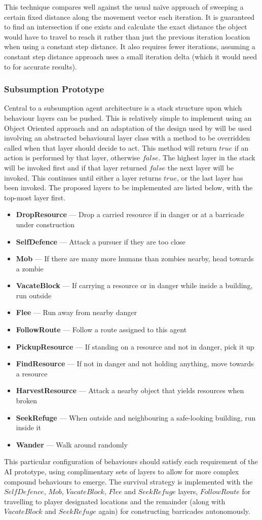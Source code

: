 \documentclass[12pt,a4paper]{article}
\newcommand{\layer}[2]{\item \textbf{#1} --- #2\vspace{-1mm}}
\begin{document}
This technique compares well against the usual na\"{i}ve approach of sweeping a certain fixed distance along the movement vector each iteration. It is guaranteed to find an intersection if one exists and calculate the exact distance the object would have to travel to reach it rather than just the previous iteration location when using a constant step distance. It also requires fewer iterations, assuming a constant step distance approach uses a small iteration delta (which it would need to for accurate results).

\subsubsection{Subsumption Prototype}\noindent
Central to a subsumption agent architecture is a stack structure upon which behaviour layers can be pushed. This is relatively simple to implement using an Object Oriented approach and an adaptation of the design used by  \citeyear{butler01} will be used involving an abstracted behavioural layer class with a method to be overridden called when that layer should decide to act. This method will return $true$ if an action is performed by that layer, otherwise $false$. The highest layer in the stack will be invoked first and if that layer returned $false$ the next layer will be invoked. This continues until either a layer returns $true$, or the last layer has been invoked. The proposed layers to be implemented are listed below, with the top-most layer first.

\noindent
\small{
\begin{itemize}
\layer{DropResource}{Drop a carried resource if in danger or at a barricade under construction}
\layer{SelfDefence}{Attack a pursuer if they are too close}
\layer{Mob}{If there are many more humans than zombies nearby, head towards a zombie}
\layer{VacateBlock}{If carrying a resource or in danger while inside a building, run outside}
\layer{Flee}{Run away from nearby danger}
\layer{FollowRoute}{Follow a route assigned to this agent}
\layer{PickupResource}{If standing on a resource and not in danger, pick it up}
\layer{FindResource}{If not in danger and not holding anything, move towards a resource}
\layer{HarvestResource}{Attack a nearby object that yields resources when broken}
\layer{SeekRefuge}{When outside and neighbouring a safe-looking building, run inside it}
\layer{Wander}{Walk around randomly}
\end{itemize}}

This particular configuration of behaviours should satisfy each requirement of the AI prototype, using complimentary sets of layers to allow for more complex compound behaviours to emerge. The survival strategy is implemented with the $SelfDefence$, $Mob$, $VacateBlock$, $Flee$ and $SeekRefuge$ layers, $FollowRoute$ for travelling to player designated locations and the remainder (along with $VacateBlock$ and $SeekRefuge$ again) for constructing barricades autonomously.
\end{document}
